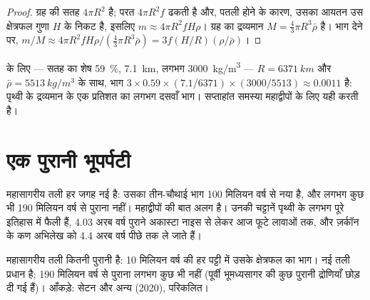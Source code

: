 \begin{proof}
ग्रह की सतह $4\pi R^2$ है; परत $4\pi R^2 f$ ढकती है और,
पतली होने के कारण, उसका आयतन उस क्षेत्रफल गुणा $H$ के निकट है, इसलिए $m \approx 4\pi R^2
f H \rho$। ग्रह का द्रव्यमान $M = \tfrac{4}{3}\pi R^3 \bar\rho$ है। भाग देने पर,
$m/M \approx 4\pi R^2 f H \rho / (\tfrac{4}{3}\pi R^3 \bar\rho) = 3 f (H/R)
(\rho/\bar\rho)$।
\end{proof}

 के लिए --- सतह का शेष \qty{59}{\percent},
\qty{7.1}{km}, लगभग \qty{3000}{kg/m^3} --- $R = \qty{6371}{km}$ और
$\bar\rho = \qty{5513}{kg/m^3}$ के साथ, भाग $3 \times 0.59 \times
(7.1/6371) \times (3000/5513) \approx 0.0011$ है: पृथ्वी के द्रव्यमान के
एक प्रतिशत का लगभग दसवाँ भाग। सप्ताहांत समस्या महाद्वीपों के लिए यही करती है।

\section{एक पुरानी भूपर्पटी}

महासागरीय तली हर जगह नई है: उसका तीन-चौथाई भाग 100 मिलियन वर्ष से
नया है, और लगभग कुछ भी 190 मिलियन वर्ष से पुराना नहीं। महाद्वीपों की
बात अलग है। उनकी चट्टानें पृथ्वी के लगभग पूरे इतिहास में फैली हैं,
4.03 अरब वर्ष पुराने अकास्टा नाइस से लेकर आज फूटे
लावाओं तक, और ज़र्कॉन के कण अभिलेख को 4.4 अरब वर्ष पीछे तक ले जाते हैं।

\begin{omfigure}

{\small महासागरीय तली कितनी पुरानी है: 10
मिलियन वर्ष की हर पट्टी में उसके क्षेत्रफल का भाग। नई तली प्रधान है; 190
मिलियन वर्ष से पुराना लगभग कुछ भी नहीं (पूर्वी भूमध्यसागर की कुछ पुरानी द्रोणियाँ छोड़ दी गई हैं)।
आँकड़े: सेटन और अन्य (2020), परिकलित।}
\end{omfigure}

